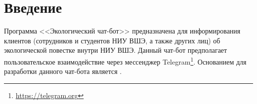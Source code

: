 \section{Введение}
\label{sec:intro}
Программа <<Экологический чат-бот>> предназначена для информирования клиентов (сотрудников и студентов
НИУ ВШЭ, а также других лиц) об экологической повестке внутри НИУ ВШЭ. Данный чат-бот предполагает
пользовательское взаимодействие через мессенджер Telegram\footnote{\url{https://telegram.org}}.
Основанием для разработки данного чат-бота является .
